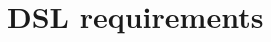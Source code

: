 \documentclass[report.tex]{subfiles}
\begin{document}

\section{DSL requirements} \label{sec:requirements}






\end{document}
